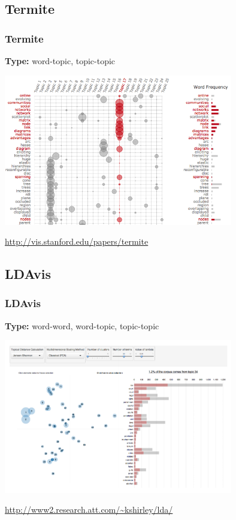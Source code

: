 \documentclass[t]{beamer}
\begin{document}
\subsection{Termite}
\begin{frame}
\frametitle{Termite}
\textbf{Type:} word-topic, topic-topic

\includegraphics[width=0.75\textwidth]{img/termite.png}

\url{http://vis.stanford.edu/papers/termite}

\cite{Chuang2012}
\end{frame}

\subsection{LDAvis}
\begin{frame}
\frametitle{LDAvis}
\textbf{Type:} word-word, word-topic, topic-topic

\includegraphics[width=0.75\textwidth]{img/ldavis.png}


\url{http://www2.research.att.com/~kshirley/lda/}

\cite{Sievert2014}
\end{frame}
\end{document}
